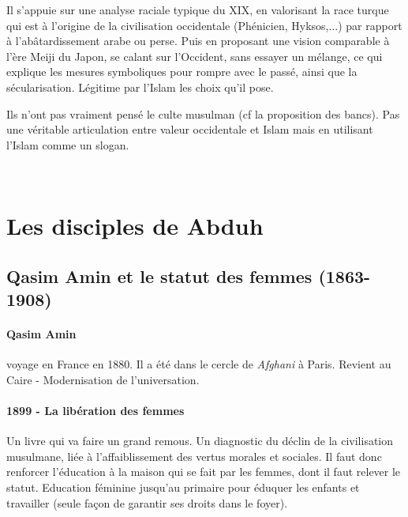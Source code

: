     
    \begin{Synthesis}
      Il s'appuie sur une analyse raciale typique du XIX, en valorisant la race turque qui est à l'origine de la civilisation occidentale  (Phénicien, Hyksos,...) par rapport à l'abâtardissement arabe ou perse.
      Puis en proposant une vision comparable à l'ère Meiji du Japon, se calant sur l'Occident, sans essayer un mélange, ce qui explique les mesures symboliques pour rompre avec le passé, ainsi que la sécularisation.
      Légitime par l'Islam les choix qu'il pose.
    \end{Synthesis}
    Ils n'ont pas vraiment pensé le culte musulman (cf la proposition des bancs). Pas une véritable articulation entre valeur occidentale et Islam mais en utilisant l'Islam comme un slogan.
    

    
  


 ~
  \hypertarget{les-disciples-de-abduh}{%
  \section{\texorpdfstring{{Les disciples de
  Abduh}}{Les disciples de Abduh}}\label{les-disciples-de-abduh}}

  

  
    
      \subsection{Qasim Amin et le statut des femmes (1863-1908)}
    
    \paragraph{Qasim Amin} voyage en France en 1880. Il a été dans le cercle de \textit{Afghani} à Paris. Revient au Caire - Modernisation de l'universation.
    
    \paragraph{1899 - La libération des femmes} Un livre qui va faire un grand remous. Un diagnostic du déclin de la civilisation musulmane, liée à l'affaiblissement des vertus morales et sociales. Il faut donc renforcer l'éducation à la maison qui se fait par les femmes, dont il faut relever le statut. Education féminine jusqu'au primaire pour éduquer les enfants et travailler (seule façon de garantir ses droits dans le foyer). 
    
